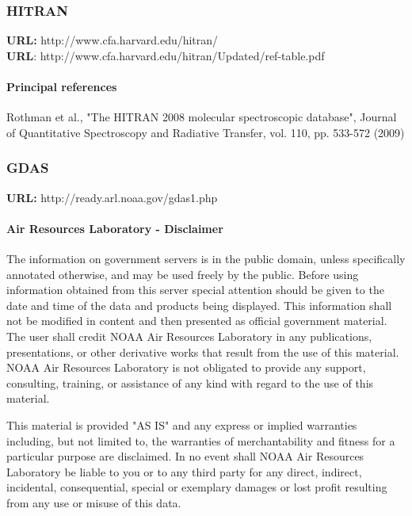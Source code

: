 \subsubsection{HITRAN}
{\bf URL:} http://www.cfa.harvard.edu/hitran/\\
{\bf URL}: http://www.cfa.harvard.edu/hitran/Updated/ref-table.pdf

\paragraph*{Principal references}

Rothman et al., "The HITRAN 2008 molecular spectroscopic database", Journal of
Quantitative Spectroscopy and Radiative Transfer, vol. 110, pp. 533-572 (2009)

\subsubsection{GDAS}
{\bf URL:} http://ready.arl.noaa.gov/gdas1.php

\paragraph*{Air Resources Laboratory - Disclaimer}

The information on government servers is in the public domain, unless
specifically annotated otherwise, and may be used freely by the public. Before
using information obtained from this server special attention should be given
to the date and time of the data and products being displayed. This information
shall not be modified in content and then presented as official government
material. The user shall credit NOAA Air Resources Laboratory in any
publications, presentations, or other derivative works that result from the use
of this material. NOAA Air Resources Laboratory is not obligated to provide any
support, consulting, training, or assistance of any kind with regard to the use
of this material.

This material is provided "AS IS" and any express or implied warranties
including, but not limited to, the warranties of merchantability and fitness
for a particular purpose are disclaimed. In no event shall NOAA Air Resources
Laboratory be liable to you or to any third party for any direct, indirect,
incidental, consequential, special or exemplary damages or lost profit
resulting from any use or misuse of this data.

